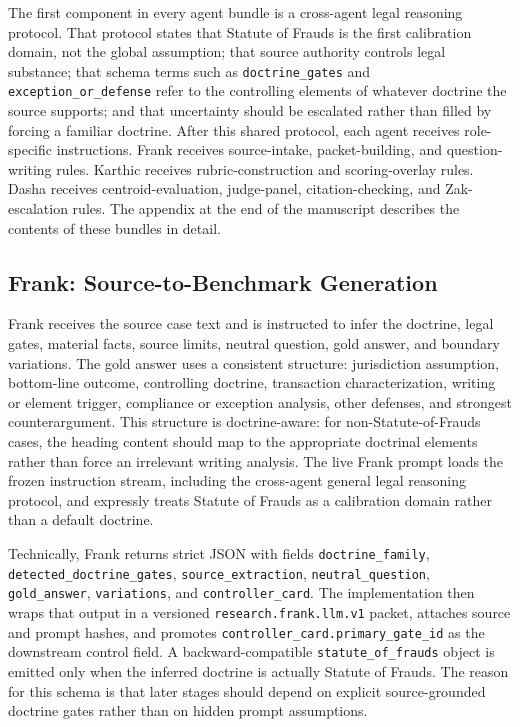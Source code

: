 The first component in every agent bundle is a cross-agent legal reasoning protocol.
That protocol states that Statute of Frauds is the first calibration domain, not
the global assumption; that source authority controls legal substance; that
schema terms such as \texttt{doctrine\_gates} and \texttt{exception\_or\_defense}
refer to the controlling elements of whatever doctrine the source supports; and
that uncertainty should be escalated rather than filled by forcing a familiar
doctrine. After this shared protocol, each agent receives role-specific
instructions. Frank receives source-intake, packet-building, and question-writing
rules. Karthic receives rubric-construction and scoring-overlay rules. Dasha
receives centroid-evaluation, judge-panel, citation-checking, and Zak-escalation
rules. The appendix at the end of the manuscript describes the contents of these
bundles in detail.

\subsection{Frank: Source-to-Benchmark Generation}

Frank receives the source case text and is instructed to infer the doctrine,
legal gates, material facts, source limits, neutral question, gold answer, and
boundary variations. The gold answer uses a consistent structure: jurisdiction
assumption, bottom-line outcome, controlling doctrine, transaction
characterization, writing or element trigger, compliance or exception analysis,
other defenses, and strongest counterargument. This structure is doctrine-aware:
for non-Statute-of-Frauds cases, the heading content should map to the
appropriate doctrinal elements rather than force an irrelevant writing analysis.
The live Frank prompt loads the frozen instruction stream, including the
cross-agent general legal reasoning protocol, and expressly treats Statute of
Frauds as a calibration domain rather than a default doctrine.

Technically, Frank returns strict JSON with fields
\texttt{doctrine\_family}, \texttt{detected\_doctrine\_gates},
\texttt{source\_extraction}, \texttt{neutral\_question}, \texttt{gold\_answer},
\texttt{variations}, and \texttt{controller\_card}. The implementation then
wraps that output in a versioned \texttt{research.frank.llm.v1} packet, attaches
source and prompt hashes, and promotes \texttt{controller\_card.primary\_gate\_id}
as the downstream control field. A backward-compatible
\texttt{statute\_of\_frauds} object is emitted only when the inferred doctrine is
actually Statute of Frauds. The reason for this schema is that later stages
should depend on explicit source-grounded doctrine gates rather than on hidden
prompt assumptions.

